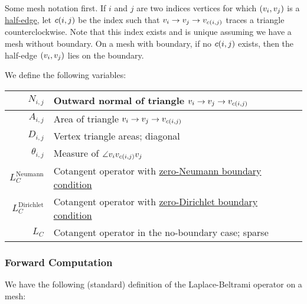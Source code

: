 Some mesh notation first. If \(i\) and \(j\) are two indices vertices for which \(\pof{v_i, v_j}\) is a \href{https://en.wikipedia.org/wiki/Doubly_connected_edge_list}{half-edge}, let \(c\pof{i, j}\) be the index such that \(v_i \to v_j \to v_{c\pof{i, j}}\) traces a triangle counterclockwise. Note that this index exists and is unique assuming we have a mesh without boundary. On a mesh with boundary, if no \(c\pof{i, j}\) exists, then the half-edge \(\pof{v_i, v_j}\) lies on the boundary.

We define the following variables: \begin{center}\begin{tabular}{r|l}
	\(N_{i, j}\) & Outward normal of triangle \(v_i \to v_j \to v_{c\pof{i, j}}\) \\ \hline
	\(A_{i, j}\) & Area of triangle \(v_i \to v_j \to v_{c\pof{i, j}}\) \\ \hline
	\(D_{i, j}\) & Vertex triangle areas; diagonal \\ \hline
	\(\theta_{i, j}\) & Measure of \(\angle v_iv_{c\pof{i, j}}v_j\) \\ \hline
	\(L_C^{\text{Neumann}}\) & Cotangent operator with \href{https://en.wikipedia.org/wiki/Neumann_boundary_condition}{zero-Neumann boundary condition} \\ \hline
	\(L_C^{\text{Dirichlet}}\) & Cotangent operator with \href{https://en.wikipedia.org/wiki/Dirichlet_boundary_condition}{zero-Dirichlet boundary condition} \\ \hline
	\(L_C\) & Cotangent operator in the no-boundary case; sparse
\end{tabular}\end{center}

\subsubsection{Forward Computation}

We have the following (standard) definition of the Laplace-Beltrami operator on a mesh:

